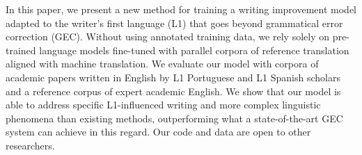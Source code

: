 In this paper, we present a new method for training a writing improvement model adapted to the writer's first language (L1) that goes beyond grammatical error correction (GEC). Without using annotated training data, we rely solely on pre-trained language models fine-tuned with parallel corpora of reference translation aligned with machine translation. We evaluate our model with corpora of academic papers written in English by L1 Portuguese and L1 Spanish scholars and a reference corpus of expert academic English. We show that our model is able to address specific L1-influenced writing and more complex linguistic phenomena than existing methods, outperforming what a state-of-the-art GEC system can achieve in this regard. Our code and data are open to other researchers.
